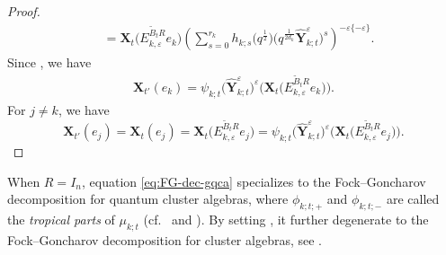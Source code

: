 \begin{proof}
\begin{align*}
 &=\mathbf{X}_{t}\bigl(E^{\tilde{B}_{t}R}_{k,\varepsilon}e_{k}\bigr)\left(\sum\limits^{r_{k}}_{s=0}h_{k;s}\bigl(q^{\frac{1}{2}}\bigr)\bigl(q^{\frac{1}{2d_{k}}}\mathbf{\hat{Y}}_{k;t}^{\varepsilon}\bigr)^{s}\right)^{-\varepsilon\{-\varepsilon\}}.
 \end{align*}
 Since , we have
 \begin{align*}
 \mathbf{X}_{t'}(e_{k})=\psi_{k;t}\bigl(\mathbf{\hat{Y}}_{k;t}^{\varepsilon}\bigr)^{\varepsilon}\bigl(\mathbf{X}_{t}\bigl(E^{\tilde{B}_{t}R}_{k,\varepsilon}e_{k}\bigr)\bigr).
 \end{align*}
 For $j\neq k$, we have
 \[
 \mathbf{X}_{t'}(e_{j})
 =\mathbf{X}_{t}(e_{j})
 =\mathbf{X}_{t}\bigl(E^{\tilde{B}_{t}R}_{k,\varepsilon}e_{j}\bigr)
 =\psi_{k;t}\bigl(\mathbf{\hat{Y}}_{k;t}^{\varepsilon}\bigr)^{\varepsilon}\bigl(\mathbf{X}_{t}\bigl(E^{\tilde{B}_{t}R}_{k,\varepsilon}e_{j}\bigr)\bigr).\tag*{\qed}
 \]\renewcommand{\qed}{}
\end{proof}

\begin{Remark}
When $R=I_n$, equation \eqref{eq:FG-dec-gqca} specializes to the Fock--Goncharov decomposition for quantum cluster algebras, where $\phi_{k;t;+}$ and $\phi_{k;t;-}$ are called the {\it tropical parts} of $\mu_{k;t}$ (cf.\ \cite[Section 3.3]{fock2009} and \cite[Section 6.3]{Keller2012}). By setting , it further degenerate to the Fock--Goncharov decomposition for cluster algebras, see \cite[Section 2.3]{LMN2023}.
\end{Remark}

